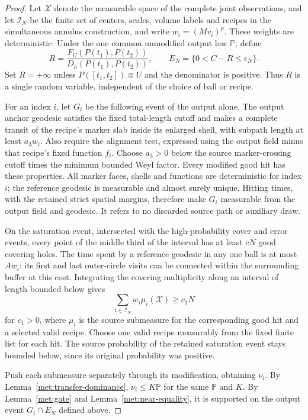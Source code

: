 \documentclass[11pt]{article}
\numberwithin{equation}{section}
\theoremstyle{definition}
\theoremstyle{remark}
\newcommand{\PP}{\mathbb P}
\newcommand{\1}{\mathbf 1}
\begin{document}
\begin{proof}
Let $\mathcal X$ denote the measurable space of the complete joint
observations, and let $\mathcal I_N$ be the finite set of centers, scales, volume
labels and recipes in the simultaneous annulus construction, and
write $w_i=(Mv_i)^p$.  These weights are deterministic.  Under the
one common unmodified output law $\PP$, define
\[
 R=\frac{F_U(P(t_1),P(t_2))}{D_h(P(t_1),P(t_2))},
 \qquad E_N=\{0<C-R\leq\epsilon_N\}.
\]
Set $R=+\infty$ unless $P([t_1,t_2])\Subset U$ and the denominator
is positive.  Thus $R$ is a single random variable, independent of
the choice of ball or recipe.

For an index $i$, let $G_i$ be the following event of the output
alone.  The output anchor geodesic satisfies the fixed total-length
cutoff and makes a complete transit of the recipe's marker slab
inside its enlarged shell, with subpath length at least $a_3w_i$.
Also require the alignment test, expressed using the output field
minus that recipe's fixed function $f_i$.  Choose $a_3>0$ below the
source marker-crossing cutoff times the minimum bounded Weyl factor.
Every modified good hit has these properties.  All marker faces,
shells and functions are deterministic for index $i$; the reference
geodesic is measurable and almost surely unique.  Hitting times,
with the retained strict spatial margins, therefore make $G_i$
measurable from the output field and geodesic.  It refers to no
discarded source path or auxiliary draw.

On the saturation event, intersected with the high-probability cover and
error events, every point of the middle third of the interval has
at least $cN$ good covering holes.  The time spent by a reference
geodesic in any one ball is at most $Aw_i$: its first and last
outer-circle visits can be connected within the surrounding buffer at this
cost.  Integrating the covering multiplicity along an interval of
length bounded below gives
\begin{equation}
 \sum_{i\in\mathcal I_N}w_i\mu_i(\mathcal X)\geq c_1N
 \label{met:source-weight}
\end{equation}
for $c_1>0$, where $\mu_i$ is the source submeasure for the
corresponding good hit and a selected valid recipe.  Choose one
valid recipe measurably from the fixed finite list for each hit.
The source probability of the retained saturation event stays
bounded below, since its original probability was positive.

Push each submeasure separately through its modification, obtaining
$\nu_i$.  By Lemma~\ref{met:transfer-dominance}, $\nu_i\leq K\PP$
for the same $\PP$ and $K$.  By Lemma~\ref{met:gate} and
Lemma~\ref{met:near-equality}, it is supported on the output event
$G_i\cap E_N$ defined above.


\end{proof}
\end{document}
